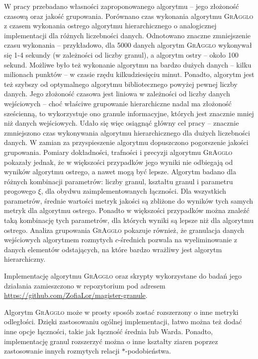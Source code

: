 \documentclass[a4paper,twoside,12pt]{book}
\newcommand{\dataset}[1]{`#1'}
\newcommand{\gowalla}{\dataset{gowalla}}
\newcommand{\brightkite}{\dataset{brightkite}}
\newcommand{\procedura}[1]{\textsc{#1}}
\newcommand{\MojAlg}{\procedura{GrAgglo}}
\newcommand{\MojHierAlg}{\procedura{FuzzyAgglo}}
\begin{document}
W pracy przebadano własności zaproponowanego algorytmu -- jego złożoność czasową oraz jakość grupowania.
%
Porównano czas wykonania algorytmu \MojAlg{} z czasem wykonania ostrego algorytmu hierarchicznego o analogicznej implementacji %
dla różnych liczebności danych. Odnotowano znaczne zmniejszenie czasu wykonania -- przykładowo, dla 5000 danych algorytm \MojAlg{} wykonywał się 1-4 sekundy (w zależności od liczby granul), a algorytm ostry -- około 100 sekund. Możliwe było też wykonanie algorytmu na bardzo dużych danych -- kilku milionach punktów -- w czasie rzędu kilkudziesięciu minut. Ponadto, algorytm jest też szybszy od optymalnego algorytmu bibliotecznego powyżej pewnej liczby danych. Jego złożoność czasowa jest liniowa w zależności od liczby danych wejściowych -- choć właściwe grupowanie hierarchiczne nadal ma złożoność sześcienną, to wykorzystuje ono granule informacyjne, których jest znacznie mniej niż danych wejściowych. Udało się więc osiągnąć główny cel pracy -- znacznie zmniejszono czas wykonywania algorytmu hierarchicznego dla dużych liczebności danych.
W zamian za przyspieszenie algorytmu dopuszczono pogorszenie jakości grupowania. Pomiary dokładności, trafności i precyzji algorytmu \MojAlg{} pokazały jednak, że w większości przypadków jego wyniki nie odbiegają od wyników algorytmu ostrego, a nawet mogą być lepsze.
%
Algorytm badano dla różnych kombinacji parametrów: liczby granul, kształtu granul i parametru progowego $\xi$, dla obydwu zaimplementowanych łączności. Dla wszystkich parametrów, średnie wartości metryk jakości są zbliżone do wyników tych samych metryk dla algorytmu ostrego. Ponadto w większości przypadków można znaleźć taką kombinację tych parametrów, dla których wyniki są lepsze niż dla algorytmu ostrego.
%
Analiza grupowania \MojAlg{} %
pokazuje również, że granulacja danych wejściowych algorytmem rozmytych $c$-średnich pozwala na wyeliminowanie z danych elementów odstających, na które bardzo wrażliwy jest algorytm hierarchiczny. 

Implementację algorytmu \MojAlg{} oraz skrypty wykorzystane do badań jego działania zamieszczono w repozytorium pod adresem \url{https://github.com/ZofiaLor/magister-granule}.

Algorytm \MojAlg{} może w prosty sposób zostać rozszerzony o inne metryki odległości. Dzięki zastosowaniu ogólnej implementacji, łatwo można też dodać inne opcje łączności, takie jak łączność średnia lub Warda. Ponadto, implementację granul rozszerzyć można o inne kształty ziaren poprzez zastosowanie innych rozmytych relacji $\ast$-podobieństwa.
\end{document}
